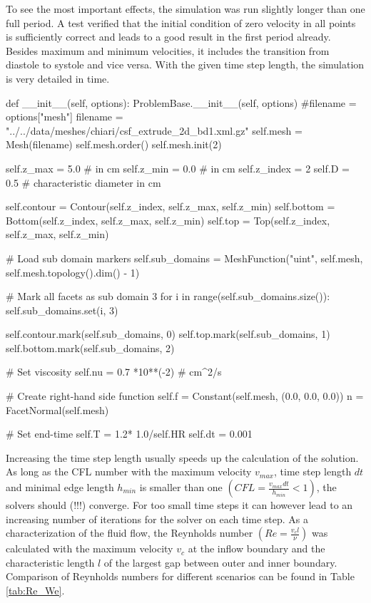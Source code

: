 To see the most important effects, the simulation was run slightly longer than one full period. A test verified that the initial condition of zero velocity in all points is sufficiently correct and leads to a good result in the first period already. Besides maximum and minimum velocities, it includes the transition from diastole to systole and vice versa.  With the given time step length, the simulation is very detailed in time.    
\begin{code}
def __init__(self, options):
	ProblemBase.__init__(self, options)
	#filename = options["mesh"]
	filename = "../../data/meshes/chiari/csf_extrude_2d_bd1.xml.gz"
	self.mesh = Mesh(filename)
	self.mesh.order()
	self.mesh.init(2)

	self.z_max = 5.0	# in cm
	self.z_min = 0.0	# in cm
	self.z_index = 2
	self.D = 0.5 		# characteristic diameter in cm

	self.contour = Contour(self.z_index, self.z_max, self.z_min)
	self.bottom = Bottom(self.z_index, self.z_max, self.z_min)
	self.top = Top(self.z_index, self.z_max, self.z_min)

    # Load sub domain markers
	self.sub_domains =  MeshFunction("uint", self.mesh, self.mesh.topology().dim() - 1)

	# Mark all facets as sub domain 3
	for i in range(self.sub_domains.size()):
		self.sub_domains.set(i, 3)

	self.contour.mark(self.sub_domains, 0)
	self.top.mark(self.sub_domains, 1)
	self.bottom.mark(self.sub_domains, 2)

    # Set viscosity 
	self.nu = 0.7 *10**(-2) # cm^2/s  

    # Create right-hand side function
	self.f = Constant(self.mesh, (0.0, 0.0, 0.0))
	n = FacetNormal(self.mesh)

    # Set end-time
	self.T = 1.2* 1.0/self.HR
	self.dt = 0.001
\end{code}

Increasing the time step length usually speeds up the calculation of
the solution. As long as the CFL number with the maximum velocity
$v_{max}$, time step length $dt$ and minimal edge length $h_{min}$ is
smaller than one $(CFL = \frac{v_{max} dt}{h_{min}} < 1)$, the solvers
should (!!!) converge. For too small time steps it can however lead to
an increasing number of iterations for the solver on each time step.
As a characterization of the fluid flow, the Reynholds number $(Re =
\frac{v_c l}{\nu})$ was calculated with the maximum velocity $v_c$ at
the inflow boundary and the characteristic length $l$ of the largest
gap between outer and inner boundary. Comparison of Reynholds numbers
for different scenarios can be found in Table \ref{tab:Re_We}.

